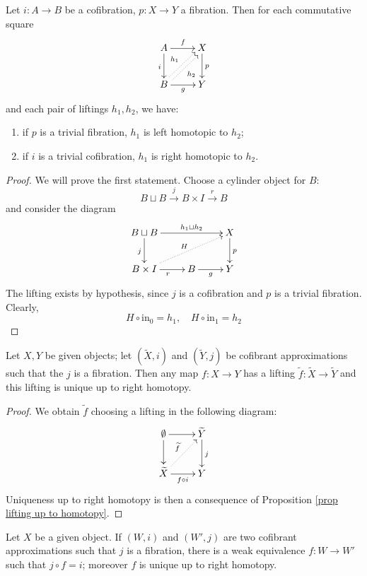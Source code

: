 \begin{refsection}
\begin{prop} \label{prop lifting up to homotopy}
Let $i \colon A \to B$ be a cofibration, $p \colon X \to Y$ a fibration. Then for each commutative square
\[
\xymatrix{
A \ar[d]_i \ar[r]^f & X \ar[d]^p \\ B \ar[r]_g \ar@<.5ex>@{.>}[ur]^{h_1} \ar@<-.5ex>@{.>}[ur]_{h_2} & Y
}
\]
and each pair of liftings $h_1,h_2$, we have:
\begin{enumerate}
\item if $p$ is a trivial fibration, $h_1$ is left homotopic to $h_2$;
\item if $i$ is a trivial cofibration, $h_1$ is right homotopic to $h_2$.
\end{enumerate}
\end{prop}

\begin{proof}
We will prove the first statement. Choose a cylinder object for $B$:
\[
B \sqcup B \xrightarrow{j} B \times I \xrightarrow{r} B
\]
and consider the diagram
\[
\xymatrix{
B \sqcup B \ar[d]_j \ar[rr]^-{h_1 \sqcup h_2} & & X \ar[d]^p \\ B \times I \ar@{.>}[urr]^H \ar[r]_r & B \ar[r]_g & Y
}
\]
The lifting exists by hypothesis, since $j$ is a cofibration and $p$ is a trivial fibration. Clearly,
\[
H \circ \mathrm{in}_0 = h_1, \quad H \circ \mathrm{in}_1 = h_2
\]
\end{proof}

\begin{cor} \label{cor lifting between approximations}
Let $X,Y$ be given objects; let $(\widetilde{X},i)$ and $(\widetilde{Y},j)$ be cofibrant approximations such that the $j$ is a fibration. Then any map $f \colon X \to Y$ has a lifting $\widetilde{f} \colon \widetilde{X} \to \widetilde{Y}$ and this lifting is unique up to right homotopy.
\end{cor}

\begin{proof}
We obtain $\widetilde{f}$ choosing a lifting in the following diagram:
\[
\xymatrix{
\emptyset \ar[d] \ar[r] & \widetilde{Y} \ar[d]^j \\ \widetilde{X} \ar@{.>}[ur]^{\widetilde{f}} \ar[r]_{f \circ i} & Y
}
\]
Uniqueness up to right homotopy is then a consequence of Proposition \ref{prop lifting up to homotopy}.
\end{proof}

\begin{cor} \label{cor uniqueness of approximation}
Let $X$ be a given object. If $(W,i)$ and $(W',j)$ are two cofibrant approximations such that $j$ is a fibration, there is a weak equivalence $f \colon W \to W'$ such that $j \circ f = i$; moreover $f$ is unique up to right homotopy.
\end{cor}


\end{refsection}
